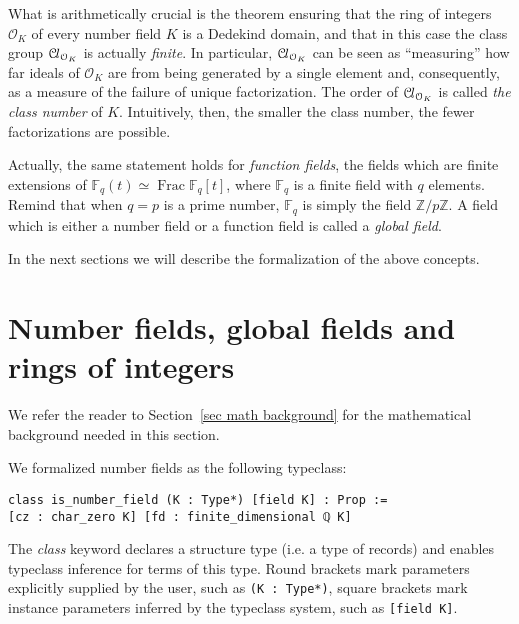 \documentclass[a4paper,USenglish,cleveref, autoref, thm-restate]{lipics-v2021}
\newcommand{\lean}[1]{\texttt{#1}\xspace} %
\newcommand*{\OK}[1][K]{\mathcal{O}_{#1}}
\newcommand*{\Cl}{\mathcal{C}\kern-.075em l}
\newcommand*{\Fq}[1][q]{\mathbb{F}_{#1}}
\newcommand{\Z}{\mathbb{Z}}
\DeclareMathOperator{\Frac}{Frac}
\begin{document}
What is arithmetically crucial is the theorem ensuring that the ring of integers $\OK$ of every number field $K$ is a Dedekind domain,
and that in this case the class group $\Cl_{\OK}$ is actually \emph{finite}.
In particular, $\Cl_{\OK}$ can be seen as ``measuring'' how far ideals of $\OK$ are from being generated by a single element and,
consequently, as a measure of the failure of unique factorization.
The order of $\Cl_{\OK}$ is called \emph{the class number} of $K$.
Intuitively, then, the smaller the class number, the fewer factorizations are possible.

Actually, the same statement holds for \emph{function fields}, the fields which are finite extensions of $\Fq(t) \simeq \Frac \Fq[q][t]$, where $\Fq$ is a finite field with $q$ elements. Remind that when $q=p$ is a prime number, $\Fq$ is simply the field $\Z/p\Z$. 
A field which is either a number field or a function field is called a \emph{global field}.

In the next sections we will describe the formalization of the above concepts.

\section{Number fields, global fields and rings of integers}

We refer the reader to Section~\ref{sec math background} for the mathematical background needed in this section.

We formalized number fields as the following typeclass:
\begin{lstlisting}
class is_number_field (K : Type*) [field K] : Prop :=
[cz : char_zero K] [fd : finite_dimensional ℚ K]
\end{lstlisting}
The \emph{class} keyword declares a structure type (i.e. a type of records) and enables typeclass inference for terms of this type.
Round brackets mark parameters explicitly supplied by the user, such as \lean{(K : Type*)},
square brackets mark instance parameters inferred by the typeclass system, such as \lean{[field K]}.
\end{document}
